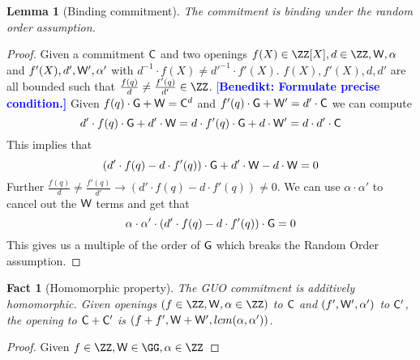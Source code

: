\documentclass[12pt]{article}
\theoremstyle{Definition}
\newtheorem{lemma}{Lemma}
\newtheorem{fact}{Fact}
\newcommand{\benedikt}[1]{{\textcolor{blue}{[\bf Benedikt: #1]}}}
\begin{document}
\begin{lemma}[Binding commitment]
\label{lem:aug-com-binding}
	The commitment is binding under the random order assumption. 
\end{lemma}
\begin{proof}
	Given a commitment $\mathsf{C}$ and two openings $f(X)\in \ZZ[X],d\in \ZZ,\gr{W},\alpha$ and $f'(X),d',\mathsf{W}',\alpha'$ with $d^{-1}\cdot f(X)\neq d'^{-1} \cdot f'(X)$. $f(X),f'(X),d,d'$ are all bounded such that $\frac{f(q)}{d}\neq \frac{f'(q)}{d'}\in \ZZ$. \benedikt{Formulate precise condition.} 
	Given $f(q)\cdot \mathsf{G} + \mathsf{W}=\mathsf{C}^d$ and $f'(q)\cdot \mathsf{G} + \mathsf{W}'=d'\cdot \mathsf{C}$ we can compute 
	$$d'\cdot f(q)\cdot \mathsf{G} + d'\cdot \mathsf{W}=d\cdot f'(q)\cdot \mathsf{G} + d\cdot \mathsf{W}'=d \cdot d'\cdot \mathsf{C}$$
	This implies that 
	$$(d'\cdot f(q)- d \cdot f'(q))\cdot \mathsf{G} + d'\cdot \mathsf{W}- d\cdot \mathsf{W}=0$$
Further $\frac{f(q)}{d}\neq \frac{f'(q)}{d'}\rightarrow (d'\cdot f(q)- d \cdot f'(q))\neq 0$. We can use $\alpha \cdot \alpha'$ to cancel out the $\mathsf{W}$ terms and get that
$$\alpha \cdot \alpha'\cdot (d'\cdot f(q)- d \cdot f'(q))\cdot \mathsf{G}=0$$
This gives us a multiple of the order of $\mathsf{G}$ which breaks the Random Order assumption.
	\end{proof}
	
	\begin{fact}[Homomorphic property]
		The GUO commitment is additively homomorphic. Given openings $(f \in \ZZ,\gr{W},\alpha \in \ZZ)$ to $\mathsf{C}$ and $(f',\mathsf{W}',\alpha')$ to $\mathsf{C}'$, the opening to $\mathsf{C} + \mathsf{C}'$ is $(f + f', \mathsf{W} + \mathsf{W}', lcm(\alpha, \alpha'))$.  \end{fact}
	\begin{proof}
		Given $f \in \ZZ,\gr{W} \in \GG, \alpha \in \ZZ$
	\end{proof}
	
\end{document}
